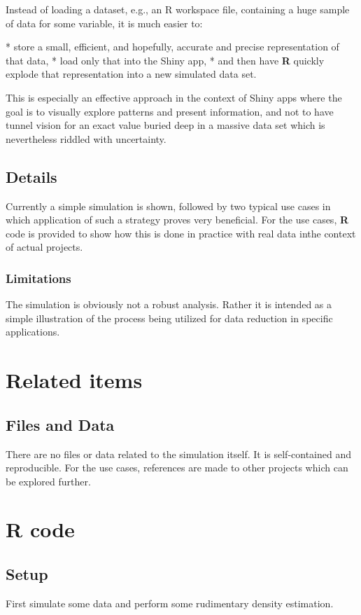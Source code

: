 \documentclass{article}\usepackage[]{graphicx}\usepackage[]{color}
\begin{document}
Instead of loading a dataset, e.g., an R workspace file, containing a huge sample of data for some variable,
it is much easier to:

* store a small, efficient, and hopefully, accurate and precise representation of that data,
* load only that into the Shiny app,
* and then have \textbf{R} quickly explode that representation into a new simulated data set.

This is especially an effective approach in the context of Shiny apps where the goal is to visually explore patterns and present information,
and not to have tunnel vision for an exact value buried deep in a massive data set which is nevertheless riddled with uncertainty.

\subsection{Details}
Currently a simple simulation is shown, followed by two typical use cases in which application of such a strategy proves very beneficial.
For the use cases, \textbf{R} code is provided to show how this is done in practice with real data inthe context of actual projects.

\subsubsection{Limitations}
The simulation is obviously not a robust analysis.
Rather it is intended as a simple illustration of the process being utilized for data reduction in specific applications.

\section{Related items}

\subsection{Files and Data}
There are no files or data related to the simulation itself.
It is self-contained and reproducible.
For the use cases, references are made to other projects which can be explored further.

\section{R code}

\subsection{Setup}
First simulate some data and perform some rudimentary density estimation.
\end{document}
